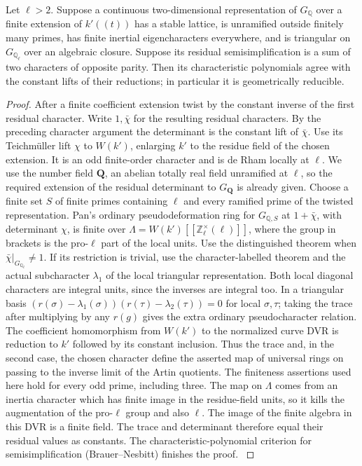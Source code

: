\begin{lemma}\label{dp:pan}
Let \(\ell>2\). Suppose a continuous two-dimensional representation
of \(G_{\mathbb Q}\) over a finite extension of \(k'((t))\) has a
stable lattice, is unramified outside finitely many primes, has
finite inertial eigencharacters everywhere, and is triangular on
\(G_{\mathbb Q_\ell}\) over an algebraic closure. Suppose its
residual semisimplification is a sum of two characters of opposite
parity. Then its characteristic polynomials agree with the constant
lifts of their reductions; in particular it is geometrically
reducible.
\end{lemma}
\begin{proof}
After a finite coefficient extension twist by the constant inverse
of the first residual character. Write \(1,\bar\chi\) for the
resulting residual characters. By the preceding character argument
the determinant is the constant lift of \(\bar\chi\). Use its
Teichm\"uller lift \(\chi\) to \(W(k')\), enlarging \(k'\) to the
residue field of the chosen extension. It is an odd finite-order
character and is de Rham locally at \(\ell\). We use the number
field \(\mathbf Q\), an abelian totally real field unramified at
\(\ell\), so the required extension of the residual determinant
to \(G_{\mathbf Q}\) is already given. Choose a finite set \(S\)
of finite primes containing \(\ell\) and every ramified prime
of the twisted representation. Pan's ordinary
pseudodeformation ring for \(G_{\mathbb Q,S}\) at \(1+\bar\chi\),
with determinant \(\chi\), is finite over
\(\Lambda=W(k')[[\mathbb Z_\ell^\times(\ell)]]\), where the group
in brackets is the pro-\(\ell\) part of the local units.
Use the distinguished theorem when
\(\bar\chi|_{G_{\mathbb Q_\ell}}\ne1\). If its restriction is
trivial, use the character-labelled theorem and the actual
subcharacter \(\lambda_1\) of the local triangular representation.
Both local diagonal characters are integral units, since the
inverses are integral too. In a triangular basis
\((r(\sigma)-\lambda_1(\sigma))(r(\tau)-\lambda_2(\tau))=0\)
for local \(\sigma,\tau\); taking the trace after multiplying by
any \(r(g)\) gives the extra ordinary pseudocharacter relation.
The coefficient homomorphism from \(W(k')\) to the normalized
curve DVR is reduction to \(k'\) followed by its constant inclusion.
Thus the trace and, in the second case, the chosen character
define the asserted map of universal rings on passing to the
inverse limit of the Artin quotients. The finiteness assertions
used here hold for every odd prime, including three.
The map on \(\Lambda\) comes from an inertia
character which has finite image in the residue-field units, so
it kills the augmentation of the pro-\(\ell\) group and also
\(\ell\). The image of the finite algebra in this DVR is a finite
field. The trace and determinant therefore equal their residual
values as constants. The characteristic-polynomial criterion for
semisimplification (Brauer--Nesbitt) finishes the proof.
\cite[Theorems~5.1.1(1) and~6.1.1(1) in the published
version, Theorems~5.1.2(1) and~6.1.2(1) on pp.~71 and~95--96
of the author manuscript]{panFM}
\end{proof}

